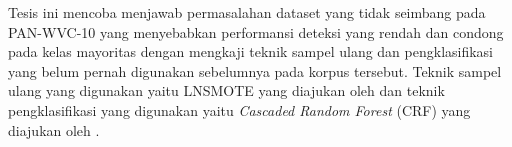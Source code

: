 Tesis ini mencoba menjawab permasalahan dataset yang tidak seimbang pada
PAN-WVC-10 yang menyebabkan performansi deteksi yang rendah dan condong pada
kelas mayoritas dengan mengkaji teknik sampel ulang dan pengklasifikasi yang
belum pernah digunakan sebelumnya pada korpus tersebut.
Teknik sampel ulang yang digunakan yaitu LNSMOTE yang diajukan oleh
\textcite{maciejewski2011local}
dan teknik pengklasifikasi yang digunakan yaitu \textit{Cascaded Random Forest}
(CRF) yang diajukan oleh \textcite{baumann2013cascaded}.
